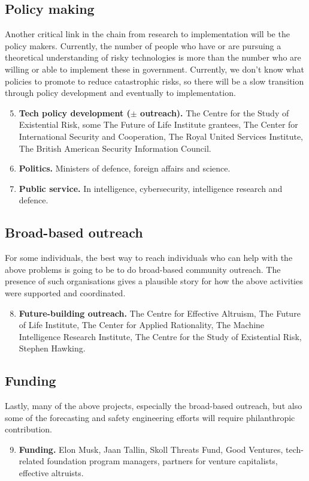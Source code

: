﻿\documentclass[12pt]{article}
\begin{document}
\subsection*{Policy making}
Another critical link in the chain from research to implementation will be the policy makers. Currently, the number of people who have or are pursuing a theoretical understanding of risky technologies is more than the number who are willing or able to implement these in government. Currently, we don't know what policies to promote to reduce catastrophic risks, so there will be a slow transition through policy development and eventually to implementation.
\begin{enumerate}[label=\textbf{\arabic*})]
        \setcounter{enumi}{4}
    \item {\bfseries Tech policy development (\(\pm\) outreach).} The Centre for the Study of Existential Risk, some The Future of Life Institute grantees, The Center for International Security and Cooperation, The Royal United Services Institute, The British American Security Information Council.
\item {\bfseries Politics.} Ministers of defence, foreign affairs and science.
        \item {\bfseries Public service.} In intelligence, cybersecurity, intelligence research and defence.
\end{enumerate}

\subsection*{Broad-based outreach}
For some individuals, the best way to reach individuals who can help with the above problems is going to be to do broad-based community outreach. The presence of such organisations gives a plausible story for how the above activities were supported and coordinated.
\begin{enumerate}[label=\textbf{\arabic*})]
        \setcounter{enumi}{7}
\item {\bfseries Future-building outreach.} The Centre for Effective Altruism, The Future of Life Institute, The Center for Applied Rationality, The Machine Intelligence Research Institute, The Centre for the Study of Existential Risk, Stephen Hawking.
\end{enumerate}

\subsection*{Funding}
Lastly, many of the above projects, especially the broad-based outreach, but also some of the forecasting and safety engineering efforts will require philanthropic contribution.
\begin{enumerate}[label=\textbf{\arabic*})]
        \setcounter{enumi}{8}
    \item {\bfseries Funding.} Elon Musk, Jaan Tallin, Skoll Threats Fund, Good Ventures, tech-related foundation program managers, partners for venture capitalists, effective altruists.
\end{enumerate}
\end{document}
